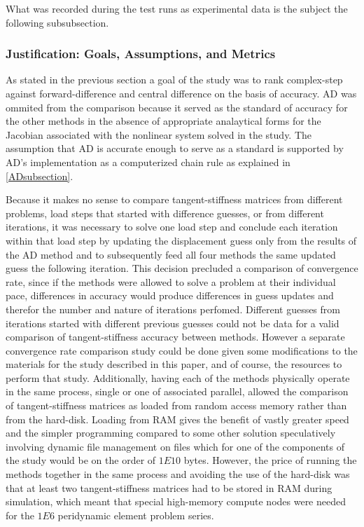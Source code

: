 \documentclass[preprint,12pt]{elsarticle}
\begin{document}
What was recorded during the test runs as experimental data is the subject the following
subsubsection. 

\subsubsection{Justification: Goals, Assumptions, and Metrics} \label{JGAM} As stated in the
previous section a goal of the study was to rank complex-step against forward-difference and central
difference on the basis of accuracy. AD was ommited from the comparison because it served as the
standard of accuracy for the other methods in the absence of appropriate analaytical forms for the
Jacobian associated with the nonlinear system solved in the study. The assumption that AD is
accurate enough to serve as a standard is supported by AD's implementation as a computerized chain
rule as explained in \ref{ADsubsection}.

Because it makes no sense to compare tangent-stiffness matrices from different problems, load steps
that started with difference guesses, or from different iterations, it was necessary to solve one
load step and conclude each iteration within that load step by updating the displacement guess only
from the results of the AD method and to subsequently feed all four methods the same updated guess
the following iteration. This decision precluded a comparison of convergence rate, since if the
methods were allowed to solve a problem at their individual pace, differences in accuracy would
produce differences in guess updates and therefor the number and nature of iterations perfomed.
Different guesses from iterations started with different previous guesses could not be data for a
valid comparison of tangent-stiffness accuracy between methods.  However a separate convergence rate
comparison study could be done given some modifications to the materials for the study described in
this paper, and of course, the resources to perform that study.   Additionally, having each of the
methods physically operate in the same process, single or one of associated parallel, allowed the
comparison of tangent-stiffness matrices as loaded from random access memory rather than from the
hard-disk.  Loading from RAM gives the benefit of vastly greater speed and the simpler programming
compared to some other solution speculatively involving dynamic file management on files which for
one of the components of the study would be on the order of $1E10$ bytes. However, the price of
running the methods together in the same process and avoiding the use of the hard-disk was that at
least two tangent-stiffness matrices had to be stored in RAM during simulation, which meant that
special high-memory compute nodes were needed for the $1E6$ peridynamic element problem series.
\end{document}
